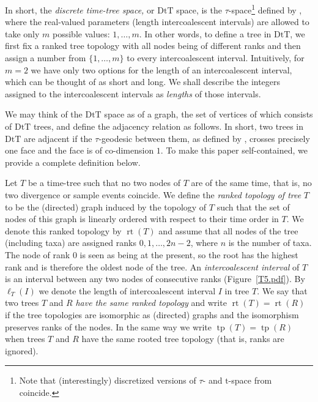 \documentclass{amsart}
\theoremstyle{definition}
\newcommand{\mdts}{\mathrm{DtT}}
\newcommand{\rt}{\operatorname{rt}}
\newcommand{\tp}{\operatorname{tp}}
\begin{document}
In short, the {\em discrete time-tree space,} or $\mdts$ space, is the
$\tau$-space\footnote{Note that (interestingly) discretized versions of $\tau$- and $\mathrm t$-space from \autocite{Gavryushkin2014-bw} coincide.}
defined by \textcite{Gavryushkin2014-bw}, where the real-valued parameters (length intercoalescent intervals) are allowed to take only $m$ possible values: $1,\ldots,m$.
In other words, to define a tree in $\mdts$, we first fix a ranked tree topology with all nodes being of different ranks and then assign a number from $\{1, \ldots, m\}$ to every intercoalescent interval.
Intuitively, for $m = 2$ we have only two options for the length of an intercoalescent interval, which can be thought of as short and long.
We shall describe the integers assigned to the intercoalescent intervals as {\em lengths} of those intervals.

We may think of the $\mdts$ space as of a graph, the set of vertices of which consists of $\mdts$ trees, and define the adjacency relation as follows.
In short, two trees in $\mdts$ are adjacent if the $\tau$-geodesic between them, as defined by \textcite{Gavryushkin2014-bw}, crosses precisely one face and the face is of co-dimension $1$.
To make this paper self-contained, we provide a complete definition below.

Let $T$ be a time-tree such that no two nodes of $T$ are of the same time, that is, no two divergence or sample events coincide.
We define the {\em ranked topology of tree} $T$ to be the (directed) graph induced by the topology of $T$ such that the set of nodes of this graph is linearly ordered with respect to their time order in $T$.
We denote this ranked topology by $\rt(T)$ and assume that all nodes of the tree (including taxa) are assigned ranks $0,1,\ldots,2n-2$, where $n$ is the number of taxa.
The node of rank $0$ is seen as being at the present, so the root has the highest rank and is therefore the oldest node of the tree.
An {\em intercoalescent interval} of $T$ is an interval between any two nodes of consecutive ranks (Figure~\ref{T5.pdf}).
By $\ell_T(I)$ we denote the length of intercoalescent interval $I$ in tree $T$.
We say that two trees $T$ and $R$ {\em have the same ranked topology} and write $\rt(T) = \rt(R)$ if the tree topologies are isomorphic as (directed) graphs and the isomorphism preserves ranks of the nodes.
In the same way we write $\tp(T) = \tp(R)$ when trees $T$ and $R$ have the same rooted tree topology (that is, ranks are ignored).
\end{document}
